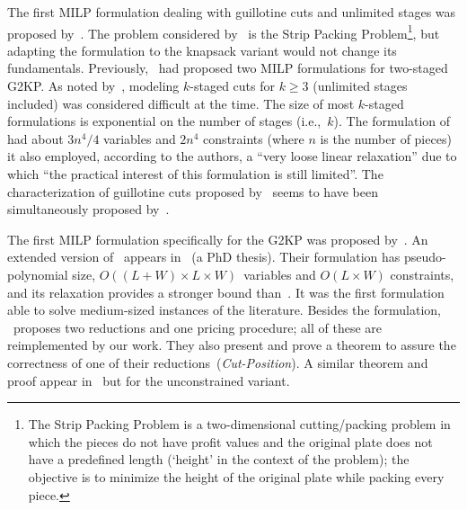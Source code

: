 \documentclass[ppgc,tese,english,formais,babel]{iiufrgs}
\begin{document}
The first MILP formulation dealing with guillotine cuts and unlimited stages was proposed by~\citet{messaoud:2008}.
The problem considered by~\citet{messaoud:2008} is the Strip Packing Problem\footnote{The Strip Packing Problem is a two-dimensional cutting/packing problem in which the pieces do not have profit values and the original plate does not have a predefined length (`height' in the context of the problem); the objective is to minimize the height of the original plate while packing every piece.}, but adapting the formulation to the knapsack variant would not change its fundamentals.
Previously, \citet{lodi:2003}~had proposed two MILP formulations for two-staged G2KP.
As noted by~\citet{belov_thesis:2003}, modeling \(k\)-staged cuts for \(k \geq 3\) (unlimited stages included) was considered difficult at the time.
The size of most \(k\)-staged formulations is exponential on the number of stages (i.e.,~\(k\)).
The formulation of~\citet{messaoud:2008} had about \(3n^4/4\) variables and \(2n^4\) constraints (where \(n\) is the number of pieces) it also employed, according to the authors, a ``very loose linear relaxation'' due to which ``the practical interest of this formulation is still limited''.
The characterization of guillotine cuts proposed by~\citet{messaoud:2008} seems to have been simultaneously proposed by~\citet{pisinger:2007}. %

The first MILP formulation specifically for the G2KP was proposed by~\citet{furini:2016}.
An extended version of~\citet{furini:2016} appears in~\citet{dimitri_thesis} (a PhD thesis).
Their formulation has pseudo-polynomial size, \(O((L + W) \times L \times W)\)~variables and \(O(L \times W)\) constraints, and its relaxation provides a stronger bound than~\citet{messaoud:2008}.
It was the first formulation able to solve medium-sized instances of the literature.
Besides the formulation, \citet{furini:2016}~proposes two reductions and one pricing procedure; all of these are reimplemented by our work.
They also present and prove a theorem to assure the correctness of one of their reductions~(\emph{Cut-Position}).
A similar theorem and proof appear in~\citet{song:2010} but for the unconstrained variant.
\end{document}
